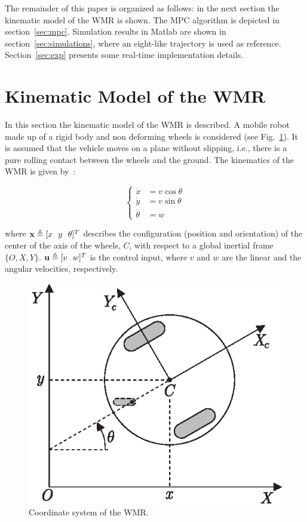 \documentclass[conference]{IEEEtran} %
\begin{document}
The remainder of this paper is organized as follows: in the next section the
kinematic model of the WMR is shown. The MPC algorithm is depicted in
section~\ref{sec:mpc}. Simulation results in {\sc Matlab} are shown in
section~\ref{sec:simulations}, where an eight-like trajectory is used as
reference. Section~\ref{sec:exp} presents some real-time implementation
details.


\section{Kinematic Model of the WMR}
\label{sec:model}

In this section the kinematic model of the WMR is described. A mobile robot
made up of a rigid body and non deforming wheels is considered (see
Fig.~\ref{fig:robot}). It is assumed that the vehicle moves on a plane
without slipping, i.e., there is a pure rolling contact between the wheels
and the ground. The kinematics of the WMR is given by~\cite{canudas92,kolmanovsky95}:

\begin{equation}
\label{eqn:model}
	\left\{
		\begin{aligned}
			\dot x	  &= v\cos\theta \\
			\dot y	  &= v\sin\theta \\
			\dot \theta &= w
		\end{aligned}
	\right.
\end{equation}

\noindent where ${\bf x}\triangleq[x~~y~~\theta]^T$ describes the
configuration (position and orientation) of the center of the axis of the
wheels, $C$, with respect to a global inertial frame $\{O,X,Y\}$.
${\bf u}\triangleq[v~~w]^T$ is the control input, where $v$ and $w$ are the
linear and the angular velocities, respectively.

\begin{figure}[htbp]
	\centering
	\includegraphics[width=0.67\linewidth]{Figures/robot.eps}
	\caption{Coordinate system of the WMR.}
	\label{fig:robot}
\end{figure}
\end{document}
